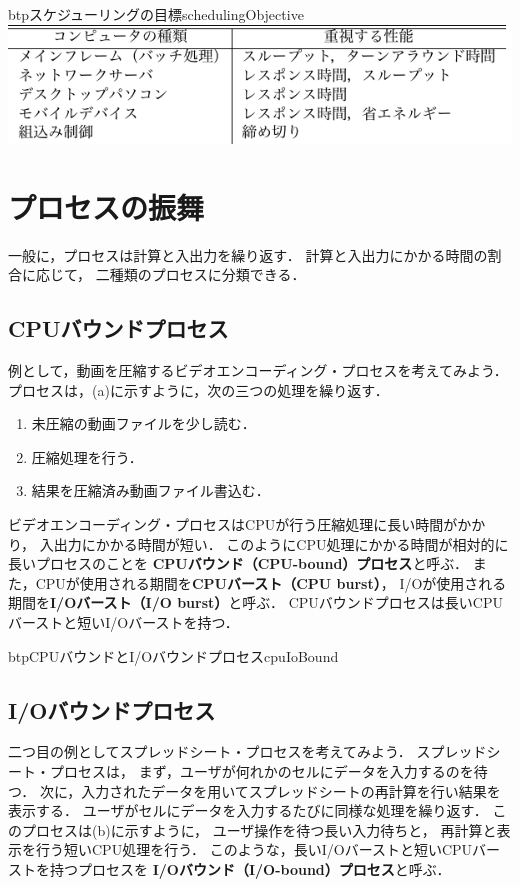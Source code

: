 \begin{mytable}{btp}{スケジューリングの目標}{schedulingObjective}
  \includegraphics[scale=1.0]{Tbl/schedulingObjective.pdf}
\end{mytable}

\section{プロセスの振舞}
一般に，プロセスは計算と入出力を繰り返す．
計算と入出力にかかる時間の割合に応じて，
二種類のプロセスに分類できる．

\subsection{CPUバウンドプロセス}
例として，動画を圧縮するビデオエンコーディング・プロセスを考えてみよう．
プロセスは，(a)に示すように，次の三つの処理を繰り返す．

\begin{enumerate}
\item 未圧縮の動画ファイルを少し読む．
\item 圧縮処理を行う．
\item 結果を圧縮済み動画ファイル書込む．
\end{enumerate}

ビデオエンコーディング・プロセスはCPUが行う圧縮処理に長い時間がかかり，
入出力にかかる時間が短い．
このようにCPU処理にかかる時間が相対的に長いプロセスのことを
{\bf CPUバウンド（CPU-bound）プロセス}と呼ぶ．
また，CPUが使用される期間を{\bf CPUバースト（CPU burst）}，
I/Oが使用される期間を{\bf I/Oバースト（I/O burst）}と呼ぶ．
CPUバウンドプロセスは長いCPUバーストと短いI/Oバーストを持つ．

\begin{myfig}{btp}{CPUバウンドとI/Oバウンドプロセス}{cpuIoBound}

\vspace{0.8cm}

\end{myfig}

\subsection{I/Oバウンドプロセス}
二つ目の例としてスプレッドシート・プロセスを考えてみよう．
スプレッドシート・プロセスは，
まず，ユーザが何れかのセルにデータを入力するのを待つ．
次に，入力されたデータを用いてスプレッドシートの再計算を行い結果を表示する．
ユーザがセルにデータを入力するたびに同様な処理を繰り返す．
このプロセスは(b)に示すように，
ユーザ操作を待つ長い入力待ちと，
再計算と表示を行う短いCPU処理を行う．
このような，長いI/Oバーストと短いCPUバーストを持つプロセスを
{\bf I/Oバウンド（I/O-bound）プロセス}と呼ぶ．

